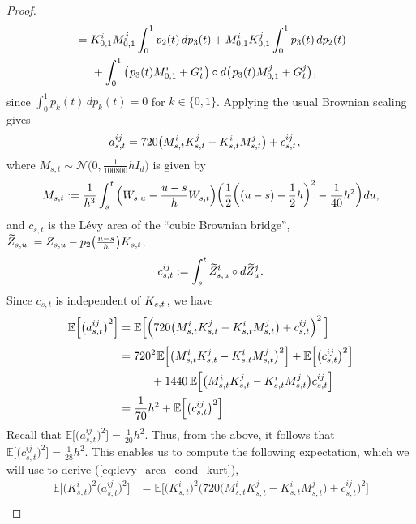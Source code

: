 \documentclass[sn-mathphys-num]{sn-jnl}%
\newcommand{\E}{\mathbb{E}}
\newcommand{\m}{\hspace{0.25mm}}
\newcommand{\mm}{\hspace{5mm}}
\newcommand{\mmm}{\hspace{10mm}}
\begin{document}
\begin{proof}
\begin{align*}
& = K_{0,1}^i M_{0,1}^j\int_0^1 p_2(t)\,dp_3(t) + M_{0,1}^i K_{0,1}^j\int_0^1 p_3(t)\,dp_2(t)\\
&\mm + \int_0^1 \big(\m p_3(t)M_{0,1}^i + G_t^i\m\big) \circ d\big(\m p_3(t)M_{0,1}^j + G_t^j\big)\m,
\end{align*}
since $\int_0^1 p_k(t)\, dp_k(t) = 0$ for $k\in\{0,1\}$. Applying the usual Brownian scaling gives
\begin{align}\label{eq:arch_area_expand}
a_{s,t}^{ij} & = 720\big(M_{s,t}^i K_{s,t}^j - K_{s,t}^i M_{s,t}^j\big) +  c_{s,t}^{ij}\m,
\end{align}
where $M_{s,t}\sim\mathcal{N}\big(0, \frac{1}{100800}h I_d\big)$ is given by
\begin{align}\label{eq:m_def}
M_{s,t} := \frac{1}{h^3}\int_s^t \Big(W_{s,u} - \frac{u-s}{h}W_{s,t}\Big)\bigg(\frac{1}{2}\bigg((u-s)-\frac{1}{2}h\bigg)^2 - \frac{1}{40}h^2\bigg)\m du,
\end{align}
and $c_{s,t}$ is the L\'{e}vy area of the ``cubic Brownian bridge'', $\widetilde{Z}_{s,u} := Z_{s,u} - p_2\big(\frac{u-s}{h}\big)K_{s,t}\m,$
\begin{align}\label{eq:c_def}
c_{s,t}^{ij} := \int_s^t \widetilde{Z}_{s,u}^i \circ d \widetilde{Z}_u^j\m.
\end{align}
Since $c_{s,t}$ is independent of $K_{s,t}\m$, we have
\begin{align*}
\E\Big[\big(a_{s,t}^{ij}\big)^2\Big] & = \E\Big[\Big(720\big(M_{s,t}^i K_{s,t}^j - K_{s,t}^i M_{s,t}^j\big) +  c_{s,t}^{ij}\Big)^2\,\Big]\\[3pt]
& = 720^2\m\E\Big[\big(M_{s,t}^i K_{s,t}^j - K_{s,t}^i M_{s,t}^j\big)^2\Big] + \E\Big[\big(c_{s,t}^{ij}\big)^2\Big]\\
&\mmm + 1440\,\E\Big[\big(M_{s,t}^i K_{s,t}^j - K_{s,t}^i M_{s,t}^j\big)c_{s,t}^{ij}\Big]\\
& = \frac{1}{70}h^2 + \E\Big[\big(c_{s,t}^{ij}\big)^2\Big].
\end{align*}
Recall that $\E\Big[\big(a_{s,t}^{ij}\big)^2\Big] = \frac{1}{20}h^2$. Thus, from the above, it follows that $\E\Big[\big(c_{s,t}^{ij}\big)^2\Big] = \frac{1}{28}h^2$.\vspace{0.5mm}
This enables us to compute the following expectation, which we will use to derive (\ref{eq:levy_area_cond_kurt}),
\begin{align*}
\E\Big[\big(K_{s,t}^i\big)^2\big(a_{s,t}^{ij}\big)^2\Big] & = \E\Big[\big(K_{s,t}^i\big)^2\big(720\big(M_{s,t}^i K_{s,t}^j - K_{s,t}^i M_{s,t}^j\big) +  c_{s,t}^{ij}\big)^2\Big]\\

\end{align*}
\end{proof}
\end{document}
